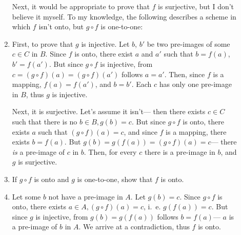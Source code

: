 \begin{description}
\begin{enumerate}
Next, it would be appropriate to prove that $f$ is surjective, but I don't
believe it myself. To my knowledge, the following describes a scheme in which
$f$ isn't onto, but $g \circ f$ is one-to-one:

\begin{center}
\end{center}

\item First, to prove that $g$ is injective. Let $b$, $b'$ be two pre-images of
some $c \in C$ in $B$. Since $f$ is onto, there exist $a$ and $a'$ such that $b
= f(a)$, $b' = f(a')$. But since $g \circ f$ is injective, from $c = (g \circ
f)(a) = (g \circ f)(a')$ follows $a = a'$. Then, since $f$ is a mapping, $f(a)
= f(a')$, and $b = b'$. Each $c$ has only one pre-image in $B$, thus $g$ is
injective.

Next, it is surjective. Let's assume it isn't--- then there exists $c \in C$
such that there is no $b \in B, g(b) = c$. But since $g \circ f$ is onto,
there exists $a$ such that $(g \circ f)(a) = c$, and since $f$ is a mapping,
there exists $b = f(a)$. But $g(b) = g(f(a)) = (g \circ f)(a) = c$--- there
\textit{is} a pre-image of $c$ in $b$. Then, for every $c$ there is a pre-image
in $b$, and $g$ is surjective.

\item If $g \circ f$ is onto and $g$ is one-to-one, show that $f$ is onto.
\item Let some $b$ not have a pre-image in $A$. Let $g(b) = c$. Since
$g \circ f$ is onto, there exists $a \in A, (g \circ f)(a) = c$, i.\ e.
$g (f(a)) = c$. But since $g$ is injective, from $g(b) = g(f(a))$ follows
$b = f(a)$--- $a$ is a pre-image of $b$ in $A$. We arrive at a contradiction,
thus $f$ is onto.

\end{enumerate}
\end{description}

